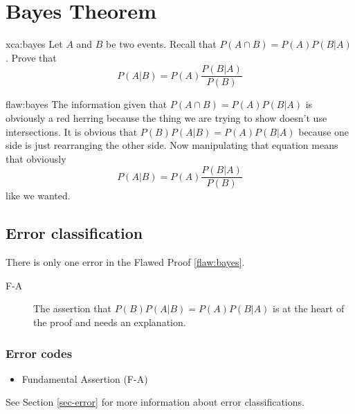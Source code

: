 \section{Bayes Theorem}

\begin{xca}{xca:bayes}
Let $A$ and $B$ be two events. Recall that $P(A\cap B) = P(A)P(B|A)$. Prove that
$$P(A|B) = P(A)\frac{P(B|A)}{P(B)} $$
\end{xca}

\begin{flaw}{flaw:bayes} %
The information given that $P(A\cap B) = P(A)P(B|A)$ is obviously a red herring because the thing we are trying to show doesn't use intersections. It is obvious that $P(B)P(A|B) = P(A)P(B|A)$ because one side is just rearranging the other side. Now manipulating that equation means that obviously $$P(A|B) = P(A)\frac{P(B|A)}{P(B)}$$ like we wanted. 
\end{flaw}

\clearpage
\subsection{Error classification}


There is only one error
 in the Flawed Proof \ref{flaw:bayes}. 
 
 \begin{description}
    \item[F-A] The assertion that $P(B)P(A|B) = P(A)P(B|A)$ is at the heart of the proof and needs an explanation.



 	
 \end{description}

 
\subsubsection{Error codes}
\begin{itemize}
    \item Fundamental Assertion (F-A)
\end{itemize}
See Section \ref{sec-error} for more information about error classifications.

